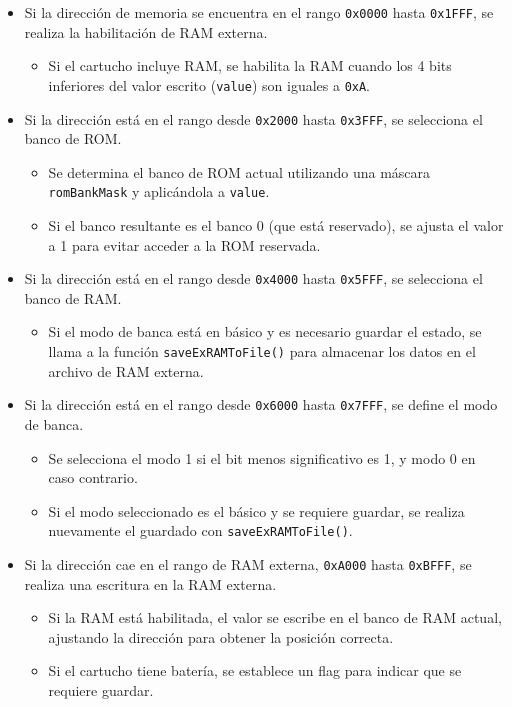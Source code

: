 \begin{itemize}
    \item Si la dirección de memoria se encuentra en el rango \texttt{0x0000} hasta \texttt{0x1FFF}, se realiza la habilitación de RAM externa. 
    \begin{itemize}
        \item Si el cartucho incluye RAM, se habilita la RAM cuando los 4 bits inferiores del valor escrito (\texttt{value}) son iguales a \texttt{0xA}.
    \end{itemize}
    
    \item Si la dirección está en el rango desde \texttt{0x2000} hasta \texttt{0x3FFF}, se selecciona el banco de ROM.
    \begin{itemize}
        \item Se determina el banco de ROM actual utilizando una máscara \texttt{romBankMask} y aplicándola a \texttt{value}. 
        \item Si el banco resultante es el banco 0 (que está reservado), se ajusta el valor a 1 para evitar acceder a la ROM reservada.
    \end{itemize}
    
    \item Si la dirección está en el rango desde \texttt{0x4000} hasta \texttt{0x5FFF}, se selecciona el banco de RAM.
    \begin{itemize}
        \item Si el modo de banca está en básico y es necesario guardar el estado, se llama a la función \texttt{saveExRAMToFile()} para almacenar los datos en el archivo de RAM externa.
    \end{itemize}
    
    \item Si la dirección está en el rango desde \texttt{0x6000} hasta \texttt{0x7FFF}, se define el modo de banca.
    \begin{itemize}
        \item Se selecciona el modo 1 si el bit menos significativo es 1, y modo 0 en caso contrario.
        \item Si el modo seleccionado es el básico y se requiere guardar, se realiza nuevamente el guardado con \texttt{saveExRAMToFile()}.
    \end{itemize}
    
    \item Si la dirección cae en el rango de RAM externa, \texttt{0xA000} hasta \texttt{0xBFFF}, se realiza una escritura en la RAM externa.
    \begin{itemize}
        \item Si la RAM está habilitada, el valor se escribe en el banco de RAM actual, ajustando la dirección para obtener la posición correcta.
        \item Si el cartucho tiene batería, se establece un flag para indicar que se requiere guardar.
    \end{itemize}
\end{itemize}

